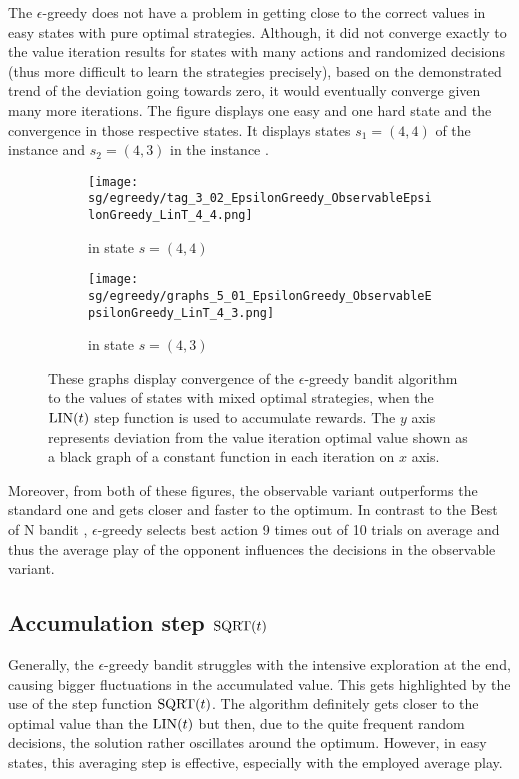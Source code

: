 \documentclass[../main.tex]{subfiles}
\begin{document}
The $\epsilon$-greedy does not have a problem in getting close to the correct values in easy states with pure optimal strategies.
Although, it did not converge exactly to the value iteration results for states with many actions and randomized decisions (thus more difficult to learn the strategies precisely), based on the demonstrated trend of the deviation going towards zero, it would eventually converge given many more iterations.
The figure  displays one easy and one hard state and the convergence in those respective states.
It displays states $s_1 = \left(4, 4\right)$ of the instance   and $s_2 = \left(4, 3\right)$ in the  instance .
\begin{figure}[ht]
    \begin{subfigure}[t]{0.45\linewidth}
        \texttt{[image: sg/egreedy/tag\_3\_02\_EpsilonGreedy\_ObservableEpsilonGreedy\_LinT\_4\_4.png]}
        \caption{ in state $s = \left(4, 4\right)$}
        \label{apx:sgexp:eps:fig:tag:44}
    \end{subfigure}
    \hfill
    \begin{subfigure}[t]{0.45\linewidth}
        \texttt{[image: sg/egreedy/graphs\_5\_01\_EpsilonGreedy\_ObservableEpsilonGreedy\_LinT\_4\_3.png]}
        \caption{ in state $s = \left(4, 3\right)$}
        \label{apx:sgexp:eps:fig:chase:43}
    \end{subfigure}
    \caption[$\epsilon$-greedy with $\lint$ learning mixed strategies]{
        These graphs display convergence of the $\epsilon$-greedy bandit algorithm to the values of states with mixed optimal strategies, when the $\lint$ step function is used to accumulate rewards.
        The $y$ axis represents deviation from the value iteration optimal value shown as a black graph of a constant function in each iteration on $x$ axis.
    }
    \label{apx:sgexp:eps:fig:hard}
\end{figure}
Moreover, from both of these figures, the observable variant outperforms the standard one and gets closer and faster to the optimum.
In contrast to the Best of N bandit , $\epsilon$-greedy selects best action 9 times out of 10 trials on average and thus the average play of the opponent influences the decisions in the observable variant.

\subsection{Accumulation step $\text{SQRT}(t)$}
Generally, the $\epsilon$-greedy bandit struggles with the intensive exploration at the end, causing bigger fluctuations in the accumulated value.
This gets highlighted by the use of the step function $\text{SQRT}(t)$.
The algorithm definitely gets closer to the optimal value than the $\lint$ but then, due to the quite frequent random decisions, the solution rather oscillates around the optimum.
However, in easy states, this averaging step is effective, especially with the employed average play.
\end{document}
